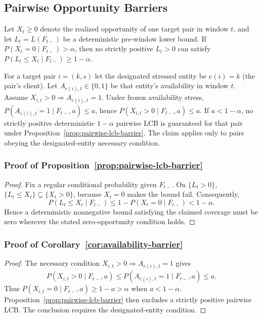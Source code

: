 \subsection{Pairwise Opportunity Barriers}
\begin{proposition}
\label{prop:pairwise-lcb-barrier}
Let $X_t\ge 0$ denote the realized opportunity of one target pair in window
$t$, and let $L_t=L(F_{t-})$ be a deterministic pre-window lower bound.  If
$P(X_t=0\mid F_{t-})>\alpha$, then no strictly positive $L_t>0$ can satisfy
$P(L_t\le X_t\mid F_{t-})\ge 1-\alpha$.
\end{proposition}

\begin{corollary}
\label{cor:availability-barrier}
For a target pair $i=(k,s)$ let the designated stressed entity be $e(i)=k$
(the pair's client).  Let $A_{e(i),t}\in\{0,1\}$ be that entity's availability
in window $t$.  Assume $X_{i,t}>0\Rightarrow A_{e(i),t}=1$.  Under frozen
availability stress, $P(A_{e(i),t}=1\mid F_{t-},a)\le a$, hence
$P(X_{i,t}>0\mid F_{t-},a)\le a$.  If $a<1-\alpha$, no strictly positive
deterministic $1-\alpha$ pairwise LCB is guaranteed for that pair under
Proposition~\ref{prop:pairwise-lcb-barrier}.  The claim applies only to pairs
obeying the designated-entity necessary condition.
\end{corollary}

\subsubsection{Proof of Proposition~\ref{prop:pairwise-lcb-barrier}}
\begin{proof}
Fix a regular conditional probability given $F_{t-}$. On $\{L_t>0\}$,
$\{L_t\le X_t\}\subseteq\{X_t>0\}$, because $X_t=0$ makes the bound fail.
Consequently,
\[
P(L_t\le X_t\mid F_{t-})\le1-P(X_t=0\mid F_{t-})<1-\alpha.
\]
Hence a deterministic nonnegative bound satisfying the claimed coverage must
be zero wherever the stated zero-opportunity condition holds.
\end{proof}

\subsubsection{Proof of Corollary~\ref{cor:availability-barrier}}
\begin{proof}
The necessary condition $X_{i,t}>0\Rightarrow A_{e(i),t}=1$ gives
\[
P(X_{i,t}>0\mid F_{t-},a)
\le P(A_{e(i),t}=1\mid F_{t-},a)\le a.
\]
Thus $P(X_{i,t}=0\mid F_{t-},a)\ge1-a>\alpha$ when $a<1-\alpha$.
Proposition~\ref{prop:pairwise-lcb-barrier} then excludes a strictly positive
pairwise LCB. The conclusion requires the designated-entity condition.
\end{proof}

